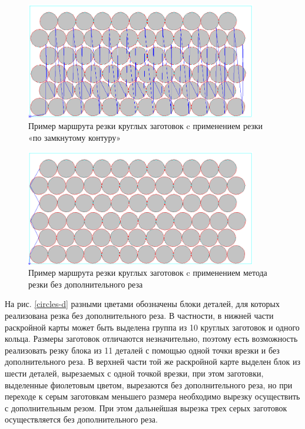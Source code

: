 \documentclass[12pt,twoside]{report}
\begin{document}
\begin{figure}
  \begin{center}
  \includegraphics[width=0.9\textwidth]{circles-a.png}
  \caption{Пример маршрута резки круглых заготовок c применением резки «по замкнутому контуру»}
  \label{circles-a}
  \end{center}
\end{figure}

\begin{figure}
  \begin{center}
  \includegraphics[width=0.9\textwidth]{circles-b.png}
  \caption{Пример маршрута резки круглых заготовок c применением метода резки без дополнительного реза}
  \label{circles-b}
  \end{center}
\end{figure}

На рис. \ref{circles-d}
разными цветами обозначены блоки деталей,
для которых реализована резка без дополнительного реза.
В частности, в нижней  части раскройной карты
может быть выделена
группа из 10 круглых заготовок и одного кольца.
Размеры заготовок отличаются незначительно,
поэтому есть возможность реализовать резку блока из 11 деталей с
помощью одной точки врезки и без дополнительного реза.
В  верхней части той же раскройной карте выделен блок из шести деталей,
вырезаемых с одной точкой врезки, при этом заготовки,
выделенные фиолетовым цветом, вырезаются без дополнительного реза,
но при переходе к серым заготовкам меньшего размера необходимо
вырезку осуществить с дополнительным резом.
При этом дальнейшая вырезка трех серых заготовок
осуществляется без дополнительного реза.
\end{document}
